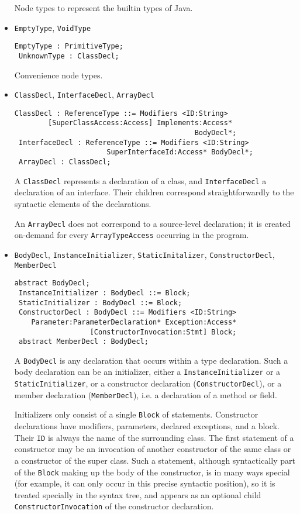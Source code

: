 \documentclass{article}
\newcommand{\nt}[1]{\texttt{#1}}
\begin{document}
\begin{itemize}
  Node types to represent the builtin types of Java.

\item \nt{EmptyType}, \nt{VoidType}
  \begin{lstlisting}[frame=single]
 EmptyType : PrimitiveType;
 UnknownType : ClassDecl;
  \end{lstlisting}

  Convenience node types.

\item \nt{ClassDecl}, \nt{InterfaceDecl}, \nt{ArrayDecl}
  \begin{lstlisting}[frame=single]
 ClassDecl : ReferenceType ::= Modifiers <ID:String> 
        [SuperClassAccess:Access] Implements:Access* 
                                           BodyDecl*;
 InterfaceDecl : ReferenceType ::= Modifiers <ID:String> 
                      SuperInterfaceId:Access* BodyDecl*;
 ArrayDecl : ClassDecl;
  \end{lstlisting}

  A \nt{ClassDecl} represents a declaration of a class, and \nt{InterfaceDecl}
  a declaration of an interface. Their children correspond straightforwardly
  to the syntactic elements of the declarations.

  An \nt{ArrayDecl} does not correspond to a source-level declaration;
  it is created on-demand for every \nt{ArrayTypeAccess} occurring 
  in the program.

\item \nt{BodyDecl}, \nt{InstanceInitializer}, \nt{StaticInitalizer},\linebreak
  \nt{ConstructorDecl}, \nt{MemberDecl}
  \begin{lstlisting}[frame=single]
 abstract BodyDecl;
 InstanceInitializer : BodyDecl ::= Block;
 StaticInitializer : BodyDecl ::= Block;
 ConstructorDecl : BodyDecl ::= Modifiers <ID:String> 
    Parameter:ParameterDeclaration* Exception:Access* 
                  [ConstructorInvocation:Stmt] Block;
 abstract MemberDecl : BodyDecl;
  \end{lstlisting}

  A \nt{BodyDecl} is any declaration that occurs within a type declaration.
  Such a body declaration can be an initializer, either a
  \nt{InstanceInitializer} or a \nt{StaticInitializer}, or a constructor
  declaration (\nt{ConstructorDecl}), or a member declaration (\nt{MemberDecl}),
  i.e. a declaration of a method or field.

  Initializers only consist of a single \nt{Block} of statements. Constructor
  declarations have modifiers, parameters, declared exceptions, and a block.
  Their \nt{ID} is always the name of the surrounding class. The first statement
  of a constructor may be an invocation of another constructor of the same class
  or a constructor of the super class. Such a statement, although syntactically
  part of the \nt{Block} making up the body of the constructor, is in many
  ways special (for example, it can only occur in this precise syntactic
  position), so it is treated specially in the syntax tree, and appears as
  an optional child \nt{ConstructorInvocation} of the constructor declaration.


\end{itemize}
\end{document}
